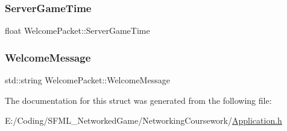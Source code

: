\subsubsection{\texorpdfstring{Server\+Game\+Time}{ServerGameTime}}
{\footnotesize\ttfamily float Welcome\+Packet\+::\+Server\+Game\+Time}

\hypertarget{struct_welcome_packet_a47dfa4e9e9ea5a2511e2478300a7be02}{}\label{struct_welcome_packet_a47dfa4e9e9ea5a2511e2478300a7be02} 
\subsubsection{\texorpdfstring{Welcome\+Message}{WelcomeMessage}}
{\footnotesize\ttfamily std\+::string Welcome\+Packet\+::\+Welcome\+Message}



The documentation for this struct was generated from the following file\+:\begin{DoxyCompactItemize}
\item 
E\+:/\+Coding/\+S\+F\+M\+L\+\_\+\+Networked\+Game/\+Networking\+Coursework/\hyperlink{_application_8h}{Application.\+h}\end{DoxyCompactItemize}
